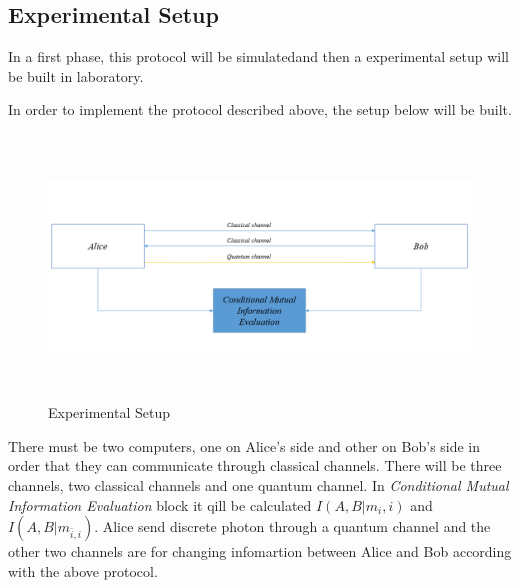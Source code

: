 \subsection{Experimental Setup}

In a first phase, this protocol will be simulatedand then a experimental setup will be built in laboratory.

In order to implement the protocol described above, the setup below will be built. 
\begin{figure}[H]
	\centering
	\includegraphics[width=1.0\textwidth, height=7cm]{./sdf/ot_with_discrete_variables/figures/SetupOt.png}
	\caption{Experimental Setup}\label{experimentalsetup}
\end{figure}

There must be two computers, one on Alice's side and other on Bob's side in order that they can communicate through classical channels. There will be three channels, two classical channels and one quantum channel. In \textit{Conditional Mutual Information Evaluation} block it qill be calculated $I(A,B|m_{i},i)$ and $I(A,B|m_{\bar{i}, i})$.
Alice send discrete photon through a quantum channel and the other two channels are for changing infomartion between Alice and Bob according with the above protocol.

